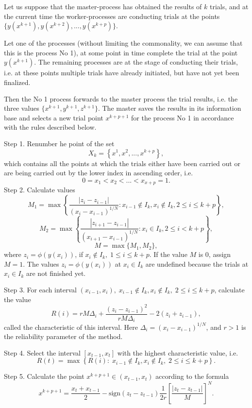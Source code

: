 \documentclass[mathematics,article,submit,pdftex,moreauthors]{Definitions/mdpi}
\begin{document}
Let us suppose that the master-process has obtained the results of $k$ trials, and at the current time the worker-processes are conducting trials at the points
$\{y(x^{k+1}), y(x^{k+2}), ...,y(x^{k+p})\}$.

Let one of the processes (without limiting the commonality, we can assume that this is the process No 1), at some point in time complete the trial at the point $y(x^{k+1})$.
The remaining processes are at the stage of conducting their trials, i.e. at these points multiple trials have already initiated, but have not yet been finalized.

Then the No 1 process forwards to the master process the trial results, i.e. the three values $\{x^{k+1},y^{k+1},z^{k+1}\}$.
The master saves the results in its information base and selects a new trial point $x^{k+p+1}$ for the process No 1 in accordance with the rules described below.

Step 1. Renumber he point of the set 
\[
X_k = \left\{x^1, x^2,...,x^{k+p} \right\},
\]
which contains all the points at which the trials either have been carried out or are being carried out by the lower index in ascending order, i.e.
\[
0=x_1<x_2<...<x_{x+p}=1.
\]
Step 2. Calculate values
\[
M_1=\max \left\{ \frac{ \left|z_i - z_{i-1} \right|}{(x_i-x_{i-1})^{1/N}} : x_{i-1} \notin I_k, x_i \notin I_k, 2\leq i\leq k+p \right\},
\]
\[
M_2=\max \left\{ \frac{ \left|z_{i+1} - z_{i-1} \right|}{(x_{i+1}-x_{i-1})^{1/N}} : x_i \in I_k, 2\leq i < k+p \right\},
\]
\[
M=\max\{M_1,M_2\},
\]
where $z_i=\phi(y(x_i))$, if $x_i \notin I_k, \; 1\leq i \leq k+p$.  If the value $M$ is 0, assign $M=1$. The values $z_i=\phi(y(x_i))$ at $x_i \in I_k$ are undefined because the trials at $x_i \in I_k$ are not finished yet.

Step 3. For each interval $(x_{i-1},x_i), \; x_{i-1} \notin I_k, x_i \notin I_k, \; 2\leq i\leq k+p$, calculate the value 
\[
R(i)=rM\Delta_i+\frac{(z_i-z_{i-1})^2}{rM\Delta_i}-2(z_i+z_{i-1}),
\]
called the characteristic of this interval. Here $\Delta_i=\left(x_i-x_{i-1}\right)^{1/N}$, and $r>1$ is the reliability parameter of the method.

Step 4. Select the interval $[x_{t-1},x_t]$ with the highest characteristic value, i.e.
\[
R(t) = \max \left\{ R(i): \; x_{i-1} \notin I_k, x_i \notin I_k, \; 2\leq i\leq k+p \right\}.
\]

Step 5. Calculate the point $x^{k+p+1} \in (x_{t-1},x_t)$ according to the formula
\[
x^{k+p+1} = \frac{x_{t}+x_{t-1}}{2} - \mathrm{sign}(z_{t}-z_{t-1})\frac{1}{2r}\left[\frac{\left|z_{t}-z_{t-1}\right|}{M}\right]^N.
\]
\end{document}
